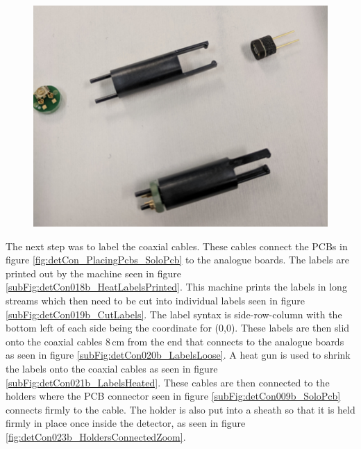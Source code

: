 \begin{figure}[htbp]
\centering
\includegraphics[width=0.8\linewidth]{Chapter3/Figs/Raster/detCon017b_HoldersWithParts.png}
\label{fig:detCon017b_HoldersWithParts}
\end{figure}

The next step was to label the coaxial cables. These cables connect the PCBs in figure \ref{fig:detCon_PlacingPcbs_SoloPcb} to the analogue boards. The labels are printed out by the machine seen in figure  \ref{subFig:detCon018b_HeatLabelsPrinted}. This machine prints the labels in long streams which then need to be cut into individual labels seen in figure \ref{subFig:detCon019b_CutLabels}. The label syntax is side-row-column with the bottom left of each side being the coordinate for (0,0). These labels are then slid onto the coaxial cables 8\,cm from the end that connects to the analogue boards as seen in figure \ref{subFig:detCon020b_LabelsLoose}. A heat gun is used to shrink the labels onto the coaxial cables as seen in figure \ref{subFig:detCon021b_LabelsHeated}. These cables are then connected to the holders where the PCB connector seen in figure \ref{subFig:detCon009b_SoloPcb} connects firmly to the cable. The holder is also put into a sheath so that it is held firmly in place once inside the detector, as seen in figure \ref{fig:detCon023b_HoldersConnectedZoom}.

